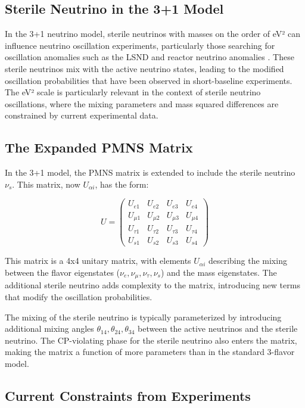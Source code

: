 \documentclass[a4paper,12pt,numbered]{article}
\begin{document}
\subsection{Sterile Neutrino in the 3+1 Model}

In the 3+1 neutrino model, sterile neutrinos with masses on the order of eV² can influence neutrino oscillation experiments, particularly those searching for oscillation anomalies such as the LSND and reactor neutrino anomalies \cite{LSND, MiniBooNE}. These sterile neutrinos mix with the active neutrino states, leading to the modified oscillation probabilities that have been observed in short-baseline experiments. The eV² scale is particularly relevant in the context of sterile neutrino oscillations, where the mixing parameters and mass squared differences are constrained by current experimental data.


\subsection{The Expanded PMNS Matrix}

In the 3+1 model, the PMNS matrix is extended to include the sterile neutrino \( \nu_s \). This matrix, now \( U_{\alpha i} \), has the form:

\[
U = \begin{pmatrix}
U_{e1} & U_{e2} & U_{e3} & U_{e4} \\
U_{\mu1} & U_{\mu2} & U_{\mu3} & U_{\mu4} \\
U_{\tau1} & U_{\tau2} & U_{\tau3} & U_{\tau4} \\
U_{s1} & U_{s2} & U_{s3} & U_{s4}
\end{pmatrix}
\]

This matrix is a 4x4 unitary matrix, with elements \( U_{\alpha i} \) describing the mixing between the flavor eigenstates (\( \nu_e, \nu_\mu, \nu_\tau, \nu_s \)) and the mass eigenstates. The additional sterile neutrino adds complexity to the matrix, introducing new terms that modify the oscillation probabilities.

The mixing of the sterile neutrino is typically parameterized by introducing additional mixing angles \( \theta_{14}, \theta_{24}, \theta_{34} \) between the active neutrinos and the sterile neutrino. The CP-violating phase for the sterile neutrino also enters the matrix, making the matrix a function of more parameters than in the standard 3-flavor model.

\subsection{Current Constraints from Experiments}
\end{document}
